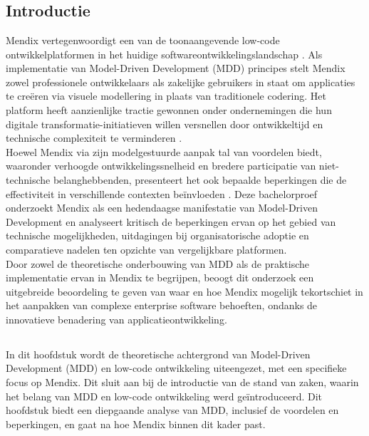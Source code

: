 \chapter{}%
\label{ch:stand-van-zaken}

\section{Introductie}
Mendix vertegenwoordigt een van de toonaangevende low-code ontwikkelplatformen in het huidige softwareontwikkelingslandschap \autocite{Hermans2023}. Als implementatie van Model-Driven Development (MDD) principes stelt Mendix zowel professionele ontwikkelaars als zakelijke gebruikers in staat om applicaties te creëren via visuele modellering in plaats van traditionele codering. Het platform heeft aanzienlijke tractie gewonnen onder ondernemingen die hun digitale transformatie-initiatieven willen versnellen door ontwikkeltijd en technische complexiteit te verminderen \autocite{Oosten2020}.
\\
Hoewel Mendix via zijn modelgestuurde aanpak tal van voordelen biedt, waaronder verhoogde ontwikkelingssnelheid en bredere participatie van niet-technische belanghebbenden, presenteert het ook bepaalde beperkingen die de effectiviteit in verschillende contexten beïnvloeden \autocite{Yerukala2022}. Deze bachelorproef onderzoekt Mendix als een hedendaagse manifestatie van Model-Driven Development en analyseert kritisch de beperkingen ervan op het gebied van technische mogelijkheden, uitdagingen bij organisatorische adoptie en comparatieve nadelen ten opzichte van vergelijkbare platformen.
\\
Door zowel de theoretische onderbouwing van MDD als de praktische implementatie ervan in Mendix te begrijpen, beoogt dit onderzoek een uitgebreide beoordeling te geven van waar en hoe Mendix mogelijk tekortschiet in het aanpakken van complexe enterprise software behoeften, ondanks de innovatieve benadering van applicatieontwikkeling.
\newpage

\section{}%
In dit hoofdstuk wordt de theoretische achtergrond van Model-Driven Development (MDD) en low-code ontwikkeling uiteengezet, met een specifieke focus op Mendix. Dit sluit aan bij de introductie van de stand van zaken, waarin het belang van MDD en low-code ontwikkeling werd geïntroduceerd. Dit hoofdstuk biedt een diepgaande analyse van MDD, inclusief de voordelen en beperkingen, en gaat na hoe Mendix binnen dit kader past.

